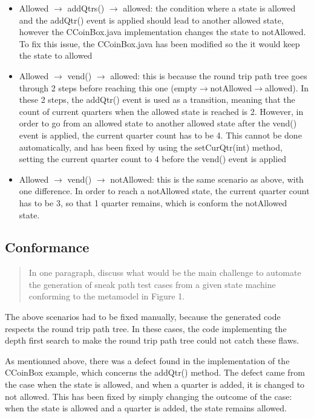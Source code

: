 \documentclass[ieee]{submit}
\begin{document}
\begin{itemize}
\item Allowed $\rightarrow$ addQtrs() $\rightarrow$ allowed: the condition where a state is allowed and the addQtr() event is applied should lead to another allowed state, however the CCoinBox.java implementation changes the state to notAllowed. To fix this issue, the CCoinBox.java has been modified so the it would keep the state to allowed
\item Allowed $\rightarrow$ vend() $\rightarrow$ allowed: this is because the round trip path tree goes through 2 steps before reaching this one (empty$\rightarrow$notAllowed$\rightarrow$allowed). In these 2 steps, the addQtr() event is used as a transition, meaning that the count of current quarters when the allowed state is reached is 2. However, in order to go from an allowed state to another allowed state after the vend() event is applied, the current quarter count has to be 4. This cannot be done automatically, and has been fixed by using the setCurQtr(int) method, setting the current quarter count to 4 before the vend() event is applied
\item Allowed $\rightarrow$ vend() $\rightarrow$ notAllowed: this is the same scenario as above, with one difference. In order to reach a notAllowed state, the current quarter count has to be 3, so that 1 quarter remains, which is conform the notAllowed state.
\end{itemize}


\subsection{Conformance}

\begin{quote}
In one paragraph, discuss what would be the main challenge to automate the generation of sneak path test cases from a given state machine conforming to the metamodel in Figure 1.
\end{quote}




The above scenarios had to be fixed manually, because the generated code respects the round trip path tree. In these cases, the code implementing the depth first search to make the round trip path tree could not catch these flaws. 

	As mentionned above, there was a defect found in the implementation of the CCoinBox example, which concerns the addQtr() method. The defect came from the case when the state is allowed, and when a quarter is added, it is changed to not allowed. This has been fixed by simply changing the outcome of the case: when the state is allowed and a quarter is added, the state remains allowed.

\received{\thedate}{\thedate}{\thedate}
\end{document}
